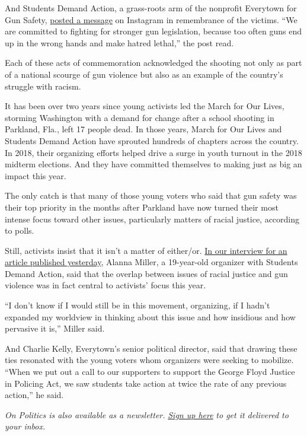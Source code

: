 And Students Demand Action, a grass-roots arm of the nonprofit Everytown
for Gun Safety, \href{https://www.instagram.com/p/CDbpUdzHq_L/}{posted a
message} on Instagram in remembrance of the victims. ``We are committed
to fighting for stronger gun legislation, because too often guns end up
in the wrong hands and make hatred lethal,'' the post read.

Each of these acts of commemoration acknowledged the shooting not only
as part of a national scourge of gun violence but also as an example of
the country's struggle with racism.

It has been over two years since young activists led the March for Our
Lives, storming Washington with a demand for change after a school
shooting in Parkland, Fla., left 17 people dead. In those years, March
for Our Lives and Students Demand Action have sprouted hundreds of
chapters across the country. In 2018, their organizing efforts helped
drive a surge in youth turnout in the 2018 midterm elections. And they
have committed themselves to making just as big an impact this year.

The only catch is that many of those young voters who said that gun
safety was their top priority in the months after Parkland have now
turned their most intense focus toward other issues, particularly
matters of racial justice, according to polls.

Still, activists insist that it isn't a matter of either/or.
\href{https://www.nytimes3xbfgragh.onion/2020/08/03/us/politics/gun-control-voters.html}{In
our interview for an article published yesterday}, Alanna Miller, a
19-year-old organizer with Students Demand Action, said that the overlap
between issues of racial justice and gun violence was in fact central to
activists' focus this year.

``I don't know if I would still be in this movement, organizing, if I
hadn't expanded my worldview in thinking about this issue and how
insidious and how pervasive it is,'' Miller said.

And Charlie Kelly, Everytown's senior political director, said that
drawing these ties resonated with the young voters whom organizers were
seeking to mobilize. ``When we put out a call to our supporters to
support the George Floyd Justice in Policing Act, we saw students take
action at twice the rate of any previous action,'' he said.

\emph{On Politics is also available as a newsletter.}
\href{https://www.nytimes3xbfgragh.onion/newsletters/politics}{\emph{Sign
up here}} \emph{to get it delivered to your inbox.}


